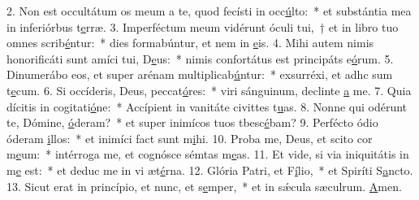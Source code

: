 2. Non est occultátum os meum a te, quod fecísti in occ\uline{ú}lto:~* et substántia mea in inferiórbus t\uline{e}rræ.
3. Imperféctum meum vidérunt óculi tui,~† et in libro tuo omnes scrib\uline{é}ntur:~* dies formabúntur, et nem in \uline{e}is.
4. Mihi autem nimis honorificáti sunt amíci tui, D\uline{e}us:~* nimis confortátus est principáts e\uline{ó}rum.
5. Dinumerábo eos, et super arénam multiplicab\uline{ú}ntur:~* exsurréxi, et adhc sum t\uline{e}cum.
6. Si occíderis, Deus, peccat\uline{ó}res:~* viri sánguinum, declinte \uline{a} me.
7. Quia dícitis in cogitati\uline{ó}ne:~* Accípient in vanitáte civittes t\uline{u}as.
8. Nonne qui odérunt te, Dómine, \uline{ó}deram?~* et super inimícos tuos tbesc\uline{é}bam?
9. Perfécto ódio óderam \uline{i}llos:~* et inimíci fact sunt m\uline{i}hi.
10. Proba me, Deus, et scito cor m\uline{e}um:~* intérroga me, et cognósce sémtas m\uline{e}as.
11. Et vide, si via iniquitátis in m\uline{e} est:~* et deduc me in vi æt\uline{é}rna.
12. Glória Patri, et F\uline{í}lio,~* et Spiríti S\uline{a}ncto.
13. Sicut erat in princípio, et nunc, et s\uline{e}mper,~* et in sǽcula sæculrum. \uline{A}men.
